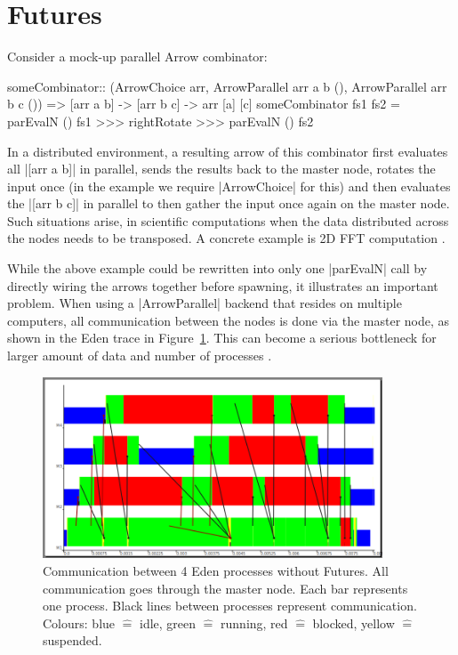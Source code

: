 \section{Futures} \label{sec:futures}\label{futures}
Consider a mock-up parallel Arrow combinator:
\begin{code}
someCombinator:: (ArrowChoice arr,
	ArrowParallel arr a b (),
	ArrowParallel arr b c ()) =>
	[arr a b] -> [arr b c] -> arr [a] [c]
someCombinator fs1 fs2 =
	parEvalN () fs1 >>>
	rightRotate >>>
	parEvalN () fs2
\end{code}

In a distributed environment, a resulting arrow of this combinator first evaluates all |[arr a b]| in parallel, sends the results back to the master node, rotates the input once (in the example we require |ArrowChoice| for this) and then evaluates the |[arr b c]| in parallel to then gather the input once again on the master node.
Such situations arise, \eg in scientific computations when the data distributed across the nodes needs to be transposed. A concrete example is 2D FFT computation \cite{Gorlatch,Berthold2009-fft}.

While the above example could be rewritten into only one |parEvalN| call by directly wiring the arrows together before spawning, it illustrates an important problem. When using a |ArrowParallel| backend that resides on multiple computers, all communication between the nodes is done via the master node, as shown in the Eden trace in Figure~\ref{fig:withoutFutures}. This can become a serious bottleneck
for larger amount of data and number of processes \citep[as e.g.][showcases]{Berthold2009-fft}.
\begin{figure}[ht]
	\centering
	\includegraphics[width=0.9\textwidth]{images/withoutFutures}
	\caption[without Futures]{Communication between 4 Eden processes without Futures. All communication goes through the master node. Each bar represents one process. Black lines between processes represent communication. Colours: blue $\hat{=}$ idle, green $\hat{=}$ running, red  $\hat{=}$ blocked, yellow $\hat{=}$ suspended.}
	\label{fig:withoutFutures}
\end{figure}


